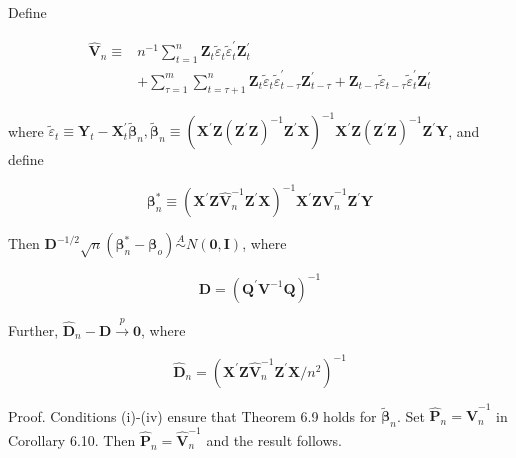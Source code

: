 \documentclass[10pt]{article}
\begin{document}
Define

$$
\begin{aligned}
\hat{\mathbf{V}}_{n} \equiv & n^{-1} \sum_{t=1}^{n} \mathbf{Z}_{t} \tilde{\varepsilon}_{t} \tilde{\varepsilon}_{t}^{\prime} \mathbf{Z}_{t}^{\prime} \\
& +\sum_{\tau=1}^{m} \sum_{t=\tau+1}^{n} \mathbf{Z}_{t} \tilde{\varepsilon}_{t} \tilde{\varepsilon}_{t-\tau}^{\prime} \mathbf{Z}_{t-\tau}^{\prime}+\mathbf{Z}_{t-\tau} \tilde{\varepsilon}_{t-\tau} \tilde{\varepsilon}_{t}^{\prime} \mathbf{Z}_{t}^{\prime}
\end{aligned}
$$

where $\tilde{\varepsilon}_{t} \equiv \mathbf{Y}_{t}-\mathbf{X}_{t}^{\prime} \tilde{\boldsymbol{\beta}}_{n}, \tilde{\boldsymbol{\beta}}_{n} \equiv\left(\mathbf{X}^{\prime} \mathbf{Z}\left(\mathbf{Z}^{\prime} \mathbf{Z}\right)^{-1} \mathbf{Z}^{\prime} \mathbf{X}\right)^{-1} \mathbf{X}^{\prime} \mathbf{Z}\left(\mathbf{Z}^{\prime} \mathbf{Z}\right)^{-1} \mathbf{Z}^{\prime} \mathbf{Y}$, and define

$$
\boldsymbol{\beta}_{n}^{*} \equiv\left(\mathbf{X}^{\prime} \mathbf{Z} \hat{\mathbf{V}}_{n}^{-1} \mathbf{Z}^{\prime} \mathbf{X}\right)^{-1} \mathbf{X}^{\prime} \mathbf{Z} \hat{\mathbf{V}}_{n}^{-1} \mathbf{Z}^{\prime} \mathbf{Y}
$$

Then $\mathbf{D}^{-1 / 2} \sqrt{n}\left(\boldsymbol{\beta}_{n}^{*}-\boldsymbol{\beta}_{o}\right) \stackrel{A}{\sim} N(\mathbf{0}, \mathbf{I})$, where

$$
\mathbf{D}=\left(\mathbf{Q}^{\prime} \mathbf{V}^{-1} \mathbf{Q}\right)^{-1}
$$

Further, $\hat{\mathbf{D}}_{n}-\mathbf{D} \xrightarrow{p} \mathbf{0}$, where

$$
\hat{\mathbf{D}}_{n}=\left(\mathbf{X}^{\prime} \mathbf{Z} \hat{\mathbf{V}}_{n}^{-1} \mathbf{Z}^{\prime} \mathbf{X} / n^{2}\right)^{-1}
$$

Proof. Conditions (i)-(iv) ensure that Theorem 6.9 holds for $\tilde{\boldsymbol{\beta}}_{n}$. Set $\hat{\mathbf{P}}_{n}= \hat{\mathbf{V}}_{n}^{-1}$ in Corollary 6.10. Then $\hat{\mathbf{P}}_{n}=\hat{\mathbf{V}}_{n}^{-1}$ and the result follows.
\end{document}
